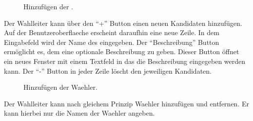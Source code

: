 \documentclass[parskip=full,11pt,twoside]{scrartcl}
\begin{document}
\begin{figure}[H]
	\caption{\label{fig:wlltr-candidate}
		Hinzufügen der .
	}
\end{figure}
Der \gls{Wahlleiter} kann über den \enquote{+} Button einen neuen Kandidaten hinzufügen. Auf der \gls{Benutzeroberflaeche} erscheint daraufhin eine neue Zeile. In dem Eingabefeld wird der Name des  eingegeben. Der \enquote{Beschreibung} Button ermöglicht es, dem  eine optionale Beschreibung zu geben. Dieser Button öffnet ein neues Fenster mit einem Textfeld in das die Beschreibung eingegeben werden kann.
Der \enquote{-} Button in jeder Zeile löscht den jeweiligen Kandidaten.


\begin{figure}[H]
	\caption{\label{fig:wlltr-voter}
		Hinzufügen der \gls{Waehler}.
	}
\end{figure}
Der \gls{Wahlleiter} kann nach gleichem Prinzip \gls{Waehler} hinzufügen und entfernen.
Er kann hierbei nur die Namen der \gls{Waehler} angeben.
\end{document}
